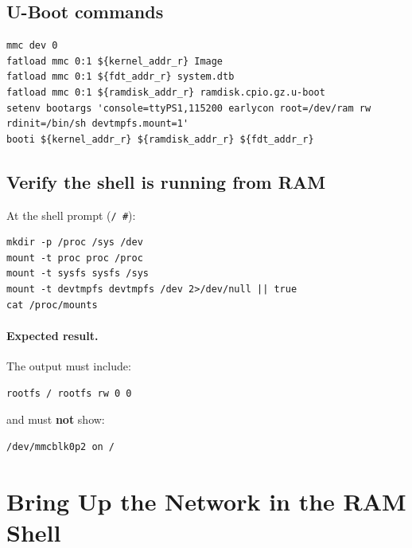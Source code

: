 \documentclass[a4paper,11pt]{article}
\begin{document}
\subsection*{U-Boot commands}
\begin{listing}[H]
\begin{verbatim}
mmc dev 0
fatload mmc 0:1 ${kernel_addr_r} Image
fatload mmc 0:1 ${fdt_addr_r} system.dtb
fatload mmc 0:1 ${ramdisk_addr_r} ramdisk.cpio.gz.u-boot
setenv bootargs 'console=ttyPS1,115200 earlycon root=/dev/ram rw rdinit=/bin/sh devtmpfs.mount=1'
booti ${kernel_addr_r} ${ramdisk_addr_r} ${fdt_addr_r}
\end{verbatim}
\caption{Boot to a real RAM shell}
\end{listing}

\subsection*{Verify the shell is running from RAM}
At the shell prompt (\texttt{/ \#}):
\begin{listing}[H]
\begin{verbatim}
mkdir -p /proc /sys /dev
mount -t proc proc /proc
mount -t sysfs sysfs /sys
mount -t devtmpfs devtmpfs /dev 2>/dev/null || true
cat /proc/mounts
\end{verbatim}
\caption{Verify the root is the initramfs}
\end{listing}

\paragraph{Expected result.}
The output must include:
\begin{listing}[H]
\begin{verbatim}
rootfs / rootfs rw 0 0
\end{verbatim}
\caption{Correct RAM-root signature}
\end{listing}

and must \textbf{not} show:
\begin{listing}[H]
\begin{verbatim}
/dev/mmcblk0p2 on /
\end{verbatim}
\caption{Incorrect result: not safe for flashing}
\end{listing}

\clearpage
\section{Bring Up the Network in the RAM Shell}
\end{document}
